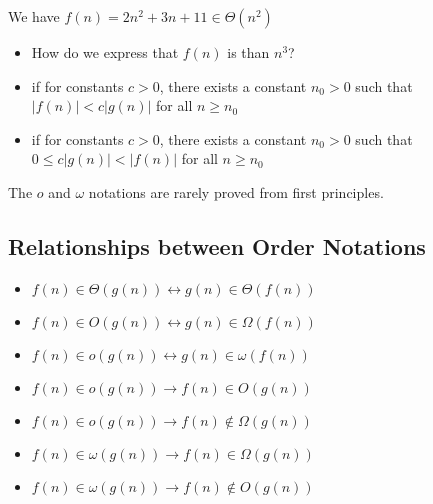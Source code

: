 \documentclass[letterpaper, 12pt]{article}
\newcommand{\red}[1]{{\color{red}{#1}}}
\begin{document}
    We have $f(n) = 2n^2 + 3n + 11 \in \Theta(n^2)$    
    \begin{itemize}
        \item How do we express that $f(n)$ is \textbf{\red{asymptotically strictly smaller}} than $n^3$?
    \end{itemize}
    \bigskip
    \red{$o$-notation}
    \begin{itemize}
        \item \red{$f(n) \in o(g(n))$} if for \textbf{\red{all}} constants $c > 0$, there exists a constant $n_0 > 0$ such that\\
        $|f(n)| < c|g(n)|$ for all $n \geq n_0$
    \end{itemize}
    \red{$\omega$-notation}
    \begin{itemize}
        \item \red{$f(n) \in \omega (g(n))$} if for \textbf{\red{all}} constants $c > 0$, there exists a constant $n_0 > 0$ such that\\
        $0 \leq c|g(n)| < |f(n)|$ for all $n \geq n_0$
    \end{itemize}
    The $o$ and $\omega$ notations are rarely proved from first principles.
    \pagebreak

    \subsection{Relationships between Order Notations}
    \begin{itemize}
        \item $f(n) \in \Theta(g(n)) \leftrightarrow g(n) \in \Theta(f(n))$
        \item $f(n) \in O(g(n)) \leftrightarrow g(n) \in \Omega(f(n))$
        \item $f(n) \in o(g(n)) \leftrightarrow g(n) \in \omega(f(n))$\\
        \bigskip
        \item $f(n) \in o(g(n)) \rightarrow f(n) \in O(g(n))$
        \item $f(n) \in o(g(n)) \rightarrow f(n) \notin \Omega(g(n))$
        \item $f(n) \in \omega(g(n)) \rightarrow f(n) \in \Omega(g(n))$
        \item $f(n) \in \omega(g(n)) \rightarrow f(n) \notin O(g(n))$
    \end{itemize}
    
\end{document}
